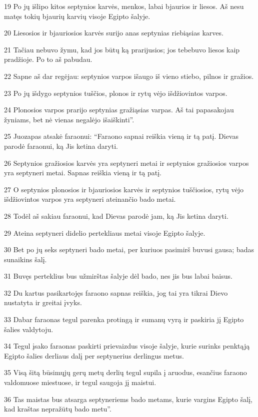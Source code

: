 \par 19 Po jų išlipo kitos septynios karvės, menkos, labai bjaurios ir liesos. Aš nesu matęs tokių bjaurių karvių visoje Egipto šalyje. 
\par 20 Liesosios ir bjauriosios karvės surijo anas septynias riebiąsias karves. 
\par 21 Tačiau nebuvo žymu, kad jos būtų ką prarijusios; jos tebebuvo liesos kaip pradžioje. Po to aš pabudau. 
\par 22 Sapne aš dar regėjau: septynios varpos išaugo iš vieno stiebo, pilnos ir gražios. 
\par 23 Po jų išdygo septynios tuščios, plonos ir rytų vėjo išdžiovintos varpos. 
\par 24 Plonosios varpos prarijo septynias gražiąsias varpas. Aš tai papasakojau žyniams, bet nė vienas negalėjo išaiškinti”. 
\par 25 Juozapas atsakė faraonui: “Faraono sapnai reiškia vieną ir tą patį. Dievas parodė faraonui, ką Jis ketina daryti. 
\par 26 Septynios gražiosios karvės yra septyneri metai ir septynios gražiosios varpos yra septyneri metai. Sapnas reiškia vieną ir tą patį. 
\par 27 O septynios plonosios ir bjauriosios karvės ir septynios tuščiosios, rytų vėjo išdžiovintos varpos yra septyneri ateinančio bado metai. 
\par 28 Todėl aš sakiau faraonui, kad Dievas parodė jam, ką Jis ketina daryti. 
\par 29 Ateina septyneri didelio pertekliaus metai visoje Egipto šalyje. 
\par 30 Bet po jų seks septyneri bado metai, per kuriuos pasimirš buvusi gausa; badas sunaikins šalį. 
\par 31 Buvęs perteklius bus užmirštas šalyje dėl bado, nes jis bus labai baisus. 
\par 32 Du kartus pasikartojęs faraono sapnas reiškia, jog tai yra tikrai Dievo nustatyta ir greitai įvyks. 
\par 33 Dabar faraonas tegul parenka protingą ir sumanų vyrą ir paskiria jį Egipto šalies valdytoju. 
\par 34 Tegul įsako faraonas paskirti prievaizdus visoje šalyje, kurie surinks penktąją Egipto šalies derliaus dalį per septynerius derlingus metus. 
\par 35 Visą šitą būsimųjų gerų metų derlių tegul supila į aruodus, esančius faraono valdomuose miestuose, ir tegul saugoja jį maistui. 
\par 36 Tas maistas bus atsarga septyneriems bado metams, kurie vargins Egipto šalį, kad kraštas nepražūtų bado metu”. 
